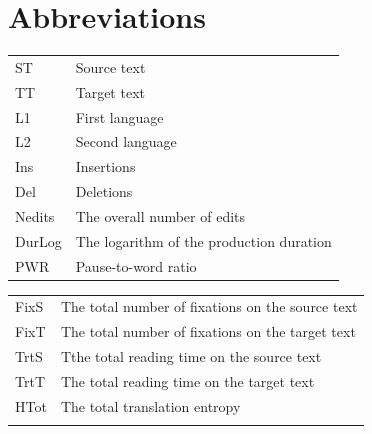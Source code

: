 \documentclass[output=paper]{langscibook}
\begin{document}
\section*{Abbreviations}




\begin{tabularx}{.45\textwidth}{lQ}
ST & Source text\\
TT & Target text\\
L1 & First language\\
L2 & Second language\\
Ins & Insertions\\
Del & Deletions\\
Nedits & The overall number of edits\\
DurLog & The logarithm of the production duration\\
PWR & Pause-to-word ratio\\
\end{tabularx}
\begin{tabularx}{.49\textwidth}{lQ}
FixS & The total number of fixations on the source text\\
FixT & The total number of fixations on the target text\\
TrtS & Tthe total reading time on the source text\\
TrtT & The total reading time on the target text\\
HTot & The total translation entropy\\
\\
\end{tabularx}
\sloppy\printbibliography[heading=subbibliography,notkeyword=this]
\end{document}
